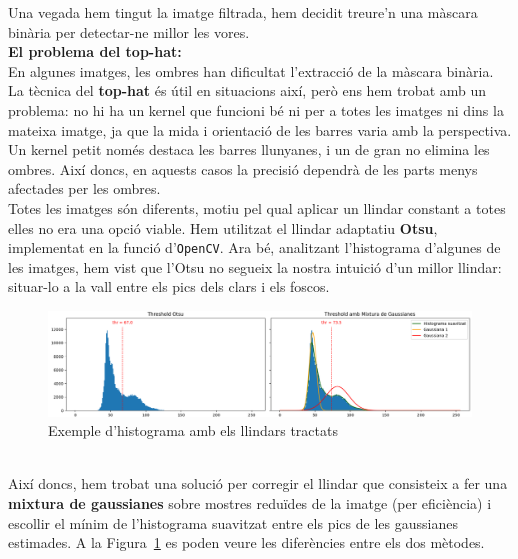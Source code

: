 \documentclass[10pt,a4paper,twocolumn,twoside]{article}
\begin{document}
Una vegada hem tingut la imatge filtrada, hem decidit treure'n una màscara binària per detectar-ne millor les vores.
\vspace*{0.5em}
\\
{\small	\textbf{El problema del top-hat:}}\vspace*{0.2em}\\
En algunes imatges, les ombres han dificultat l’extracció de la màscara binària. La tècnica del \textbf{top-hat} és útil en situacions així, però ens hem trobat amb un problema: no hi ha un kernel que funcioni bé ni per a totes les imatges ni dins la mateixa imatge, ja que la mida i orientació de les barres varia amb la perspectiva. Un kernel petit només destaca les barres llunyanes, i un de gran no elimina les ombres. Així doncs, en aquests casos la precisió dependrà de les parts menys afectades per les ombres.
\vspace*{0.5em}
\\
Totes les imatges són diferents, motiu pel qual aplicar un llindar constant a totes elles no era una opció viable. Hem utilitzat el llindar adaptatiu \textbf{Otsu}, implementat en la funció d'\texttt{OpenCV}. Ara bé, analitzant l'histograma d'algunes de les imatges, hem vist que l'Otsu no segueix la nostra intuició d'un millor llindar: situar-lo a la vall entre els pics dels clars i els foscos.
\begin{figure}[!h]
	\centering
	\includegraphics[width=\linewidth]{figs/thresholds}
	\caption{Exemple d'histograma amb els llindars tractats}
	\label{fig:f}
\end{figure}
\\
Així doncs, hem trobat una solució per corregir el llindar que consisteix a fer una \textbf{mixtura de gaussianes} sobre mostres reduïdes de la imatge (per eficiència) i escollir el mínim de l’histograma suavitzat entre els pics de les gaussianes estimades. A la Figura~\ref{fig:f} es poden veure les diferències entre els dos mètodes.
\end{document}
